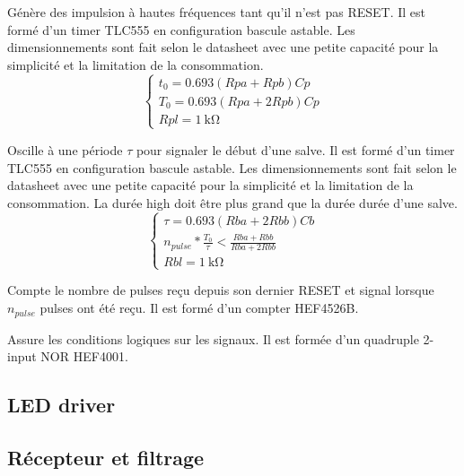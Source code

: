 \documentclass[french]{layout/Report}
\begin{document}
\begin{description}[leftmargin=!,labelwidth=3cm, labelindent=\parindent]
	\item[Pulse timer] Génère des impulsion à hautes fréquences tant qu'il n'est pas RESET. Il est formé d'un timer TLC555 en configuration bascule astable. Les dimensionnements sont fait selon le datasheet avec une petite capacité pour la simplicité et la limitation de la consommation.
		\begin{equation*}
			\begin{cases}
				t_0 = 0.693(Rpa+Rpb)Cp \\
				T_0 = 0.693(Rpa+2Rpb)Cp \\
				Rpl	= \SI{1}{\kilo\ohm}
			\end{cases}
		\end{equation*}
	\item[Burst timer] Oscille à une période $\tau$ pour signaler le début d'une salve. Il est formé d'un timer TLC555 en configuration bascule astable. Les dimensionnements sont fait selon le datasheet avec une petite capacité pour la simplicité et la limitation de la consommation. La durée high doit être plus grand que la durée durée d'une salve.
		\begin{equation*}
			\begin{cases}
				\tau = 0.693(Rba+2Rbb)Cb \\
				n_{pulse}*\frac{T_0}{\tau} < \frac{Rba+Rbb}{Rba+2Rbb} \\
				Rbl	= \SI{1}{\kilo\ohm}
			\end{cases}
		\end{equation*}
	\item[Decounter] Compte le nombre de pulses reçu depuis son dernier RESET et signal lorsque $n_{pulse}$ pulses ont été reçu. Il est formé d'un compter HEF4526B.
	\item[Logic] Assure les conditions logiques sur les signaux. Il est formée d'un quadruple 2-input NOR HEF4001.
\end{description}

\subsection{LED driver}

\subsection{Récepteur et filtrage}
\end{document}
